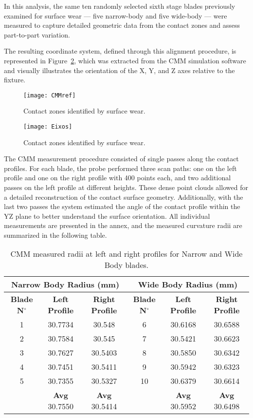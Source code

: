 In this analysis, the same ten randomly selected sixth stage blades previously examined for surface wear — five narrow-body and five wide-body — were measured to capture detailed geometric data from the contact zones and assess part-to-part variation.

The resulting coordinate system, defined through this alignment procedure, is represented in Figure~\ref{fig:Eixos}, which was extracted from the CMM simulation software and visually illustrates the orientation of the X, Y, and Z axes relative to the fixture.


\begin{figure}[H]
    \centering
    \texttt{[image: CMMref]}
    \caption{Contact zones identified by surface wear.}
    \label{fig:CMMref}
\end{figure}

\begin{figure}[H]
    \centering
    \texttt{[image: Eixos]}
    \caption{Contact zones identified by surface wear.}
    \label{fig:Eixos}
\end{figure}

The CMM measurement procedure consisted of single passes along the contact profiles. For each blade, the probe performed three scan paths: one on the left profile and one on the right profile with 400 points each, and two additional passes on the left profile at different heights. These dense point clouds allowed for a detailed reconstruction of the contact surface geometry.
Additionally, with the last two passes the system estimated the angle of the contact profile within the YZ plane to better understand the surface orientation. All individual measurements are presented in the annex, and the measured curvature radii are summarized in the following table.

\begin{table}[H]
    \centering
    \caption{CMM measured radii at left and right profiles for Narrow and Wide Body blades.}
    \begin{tabular}{ccc|ccc}
    \hline
    \multicolumn{3}{c}{\textbf{Narrow Body Radius (mm)}} & \multicolumn{3}{c}{\textbf{Wide Body Radius (mm)}} \\ \hline
    \textbf{Blade N$^{\circ}$} & \textbf{Left Profile} & \textbf{Right Profile} & \textbf{Blade N$^{\circ}$} & \textbf{Left Profile} & \textbf{Right Profile} \\ \hline
    1 & 30.7734 & 30.548  & 6 & 30.6168 & 30.6588 \\
    2 & 30.7584 & 30.545  & 7 & 30.5421 & 30.6623 \\
    3 & 30.7627 & 30.5403 & 8 & 30.5850 & 30.6342 \\ 
    4 & 30.7451 & 30.5411 & 9 & 30.5942 & 30.6323 \\ 
    5 & 30.7355 & 30.5327 & 10 & 30.6379 & 30.6614 \\ \hline
     & \textbf{Avg} 30.7550 & \textbf{Avg} 30.5414 & & \textbf{Avg} 30.5952 & \textbf{Avg} 30.6498 \\ \hline
    \end{tabular}
\end{table}
    
